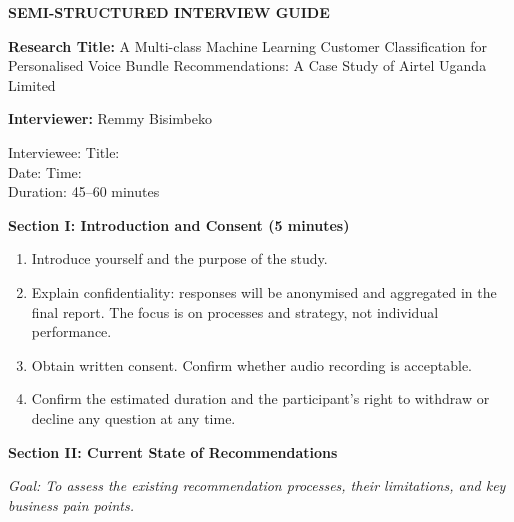 \begin{center}
\textbf{SEMI-STRUCTURED INTERVIEW GUIDE}
\end{center}

\textbf{Research Title:} A Multi-class Machine Learning Customer Classification for Personalised Voice Bundle Recommendations: A Case Study of Airtel Uganda Limited

\textbf{Interviewer:} Remmy Bisimbeko

\vspace{0.3cm}
\noindent
Interviewee: \underline{\hspace{6cm}} Title: \underline{\hspace{4cm}} \\[0.4cm]
Date: \underline{\hspace{4cm}} Time: \underline{\hspace{4cm}} \\[0.2cm]
Duration: 45--60 minutes

\vspace{0.4cm}
\textbf{Section I: Introduction and Consent (5 minutes)}
\begin{enumerate}
    \item Introduce yourself and the purpose of the study.
    \item Explain confidentiality: responses will be anonymised and aggregated in the final report. The focus is on processes and strategy, not individual performance.
    \item Obtain written consent. Confirm whether audio recording is acceptable.
    \item Confirm the estimated duration and the participant's right to withdraw or decline any question at any time.
\end{enumerate}

\vspace{0.3cm}
\textbf{Section II: Current State of Recommendations}

\textit{Goal: To assess the existing recommendation processes, their limitations, and key business pain points.}


